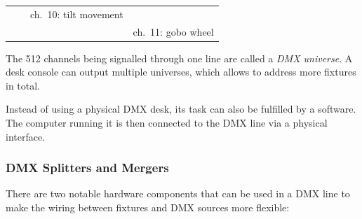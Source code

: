 \begin{longtable}[]{@{}llll@{}}
\begin{minipage}[t]{0.12\columnwidth}
\strut
\end{minipage} & \begin{minipage}[t]{0.15\columnwidth}\raggedright\strut
\strut
\end{minipage} & \begin{minipage}[t]{0.28\columnwidth}\raggedright\strut
ch.~10: tilt movement\strut
\end{minipage}\tabularnewline
\begin{minipage}[t]{0.17\columnwidth}\raggedright\strut
\strut
\end{minipage} & \begin{minipage}[t]{0.12\columnwidth}\raggedright\strut
\strut
\end{minipage} & \begin{minipage}[t]{0.15\columnwidth}\raggedright\strut
\strut
\end{minipage} & \begin{minipage}[t]{0.28\columnwidth}\raggedright\strut
ch.~11: gobo wheel\strut
\end{minipage}\tabularnewline
\bottomrule
\end{longtable}

The 512 channels being signalled through one line are called a \emph{DMX
universe}. A desk console can output multiple universes, which allows to
address more fixtures in total.

Instead of using a physical DMX desk, its task can also be fulfilled by
a software. The computer running it is then connected to the DMX line
via a physical interface.

\hypertarget{sec:splitters-mergers}{\subsubsection{DMX Splitters and
Mergers}\label{sec:splitters-mergers}}

There are two notable hardware components that can be used in a DMX line
to make the wiring between fixtures and DMX sources more flexible:


